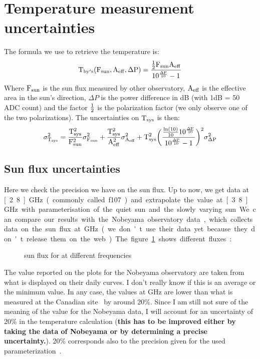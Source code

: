 \section{Temperature measurement uncertainties}
The formula we use to retrieve the temperature is:
\begin{equation}
  \rm
  T_{by's} (F_{sun}, A_{eff}, \Delta P) = \frac{\frac{1}{2} F_{sun} A_{eff}}{10^{\frac{\Delta P}{10}} -1 }
\label{eq:tsys}
\end{equation}
Where $\rm  F_{sun}$ is  the sun flux  measured by  other observatory,
$\rm A_{eff}$ is the effective area in the sun's direction, $\Delta P$
is the power difference in dB (with 1dB = 50 ADC count) and the factor
$\rm \frac{1}{2}$ is  the polarization factor (we only  observe one of
the two polarizations). The uncertainties on $\rm T_{sys}$ is then:
\begin{equation}
  \rm       \sigma_{T_{sys}}^2      =      \frac{T_{sys}^2}{F_{sun}^2}
  \sigma_{F_{sun}}^2  + \frac{T_{sys}^2}{A_{eff}^2} \sigma_{A_{eff}}^2
  +   T_{sys}^2   \bigg(\frac{   \frac{\ln(10)}{10}   10^{\frac{\Delta
        P}{10}}}{10^{\frac{\Delta P}{10}}  - 1}\bigg)^2 \sigma_{\Delta
    P}^2
\end{equation}

\subsection{Sun flux uncertainties}
Here we check the precision we have on the sun flux. Up to now, we get
data  at \unit[2.8]{GHz}  (commonly called  f107) and  extrapolate the
value at  \unit[3.8]{GHz} with parameterisation  of the quiet  sun and
the slowly varying  sun. We can compare our  results with the Nobeyama
observatory data, which  collects data on the sun  flux at \unit[2 and
  4]{GHz} (we don't use their data yet because they don't release them
on the web). The figure~\ref{fig:sunflux} shows different fluxes: 

\begin{figure}[!ht]
 \centering
 \hspace*{-3ex}
 \caption{sun flux for at different frequencies}
 \label{fig:sunflux}
\end{figure}
The value reported on the plots for the Nobeyama observatory are taken
from what is  displayed on their daily curves. I  don't really know if
this is an  average or the minimum value.  In any  case, the values at
\unit[2 and  4]{GHz} are lower than  what is measured  at the Canadian
site~\cite{sundata,  sundata2} by around  20\%. Since  I am  still not
sure of the meaning of the value for the Nobeyama data, I will account
for   an  uncertainty   of   20\%  in   the  temperature   calculation
(\textbf{this has to be improved either by taking the data of Nobeyama
  or by determining a precise uncertainty.}). 20\% corresponds also to
the precision given for the used parameterization~\cite{sunparam}.


